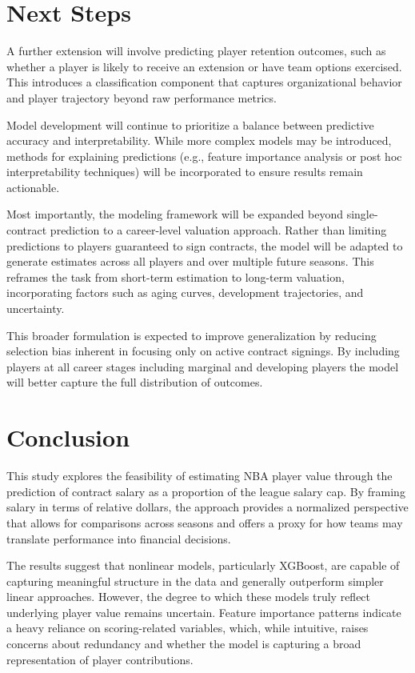 \documentclass[conference]{IEEEtran}
\begin{document}
\section{Next Steps}

A further extension will involve predicting player retention outcomes, such as whether a player is likely to receive an extension or have team options exercised. This introduces a classification component that captures organizational behavior and player trajectory beyond raw performance metrics.

Model development will continue to prioritize a balance between predictive accuracy and interpretability. While more complex models may be introduced, methods for explaining predictions (e.g., feature importance analysis or post hoc interpretability techniques) will be incorporated to ensure results remain actionable.

Most importantly, the modeling framework will be expanded beyond single-contract prediction to a career-level valuation approach. Rather than limiting predictions to players guaranteed to sign contracts, the model will be adapted to generate estimates across all players and over multiple future seasons. This reframes the task from short-term estimation to long-term valuation, incorporating factors such as aging curves, development trajectories, and uncertainty.

This broader formulation is expected to improve generalization by reducing selection bias inherent in focusing only on active contract signings. By including players at all career stages including marginal and developing players the model will better capture the full distribution of outcomes.

\section{Conclusion}

This study explores the feasibility of estimating NBA player value through the prediction of contract salary as a proportion of the league salary cap. By framing salary in terms of relative dollars, the approach provides a normalized perspective that allows for comparisons across seasons and offers a proxy for how teams may translate performance into financial decisions.

The results suggest that nonlinear models, particularly XGBoost, are capable of capturing meaningful structure in the data and generally outperform simpler linear approaches. However, the degree to which these models truly reflect underlying player value remains uncertain. Feature importance patterns indicate a heavy reliance on scoring-related variables, which, while intuitive, raises concerns about redundancy and whether the model is capturing a broad representation of player contributions.
\end{document}
